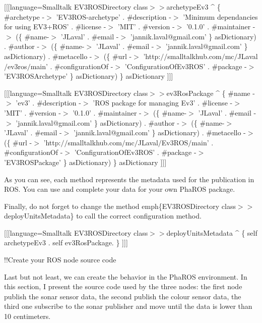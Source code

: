 \documentclass[a4paper,10pt,twoside]{book}
\begin{document}
{[}{[}{[}language=Smalltalk
EV3ROSDirectory class$>$$>$archetypeEv3
  \string^ \{
      \#archetype -$>$ 'EV3ROS-archetype' .
      \#description -$>$ 'Minimum dependancies for using EV3+ROS' .
      \#license -$>$  'MIT'  .
      \#version -$>$ '0.1.0' .
      \#maintainer -$>$ (\{
        \#name-$>$ 'JLaval' .
        \#email -$>$ 'jannik.laval@gmail.com'
      \}  asDictionary) .
      \#author -$>$ (\{
        \#name-$>$ 'JLaval' .
        \#email -$>$ 'jannik.laval@gmail.com'
      \} asDictionary) .
      \#metacello -$>$ (\{
        \#url -$>$ 'http:$/$$/$smalltalkhub.com$/$mc$/$JLaval$/$ev3ros$/$main' .
        \#configurationOf -$>$ 'ConfigurationOfEv3ROS' .
        \#package -$>$ 'EV3ROSArchetype'
      \} asDictionary)
     \} asDictionary
{]}{]}{]}


{[}{[}{[}language=Smalltalk
EV3ROSDirectory class$>$$>$ev3RosPackage
  \string^ \{
      \#name -$>$ 'ev3' .
      \#description -$>$ 'ROS package for managing Ev3' .
      \#license -$>$  'MIT'  .
      \#version -$>$ '0.1.0' .
      \#maintainer -$>$ (\{
        \#name-$>$ 'JLaval' .
        \#email -$>$ 'jannik.laval@gmail.com'
      \}  asDictionary) .
      \#author -$>$ (\{
        \#name-$>$ 'JLaval' .
        \#email -$>$ 'jannik.laval@gmail.com'
      \} asDictionary) .
      \#metacello -$>$ (\{
        \#url -$>$ 'http:$/$$/$smalltalkhub.com$/$mc$/$JLaval$/$Ev3ROS$/$main' .
        \#configurationOf -$>$ 'ConfigurationOfEv3ROS' .
        \#package -$>$ 'EV3ROSPackage'
      \} asDictionary)
     \} asDictionary
{]}{]}{]}

As you can see, each method represents the metadata used for the publication in ROS. You can use and complete your data for your own PhaROS package.

Finally, do not forget to change the method emph\{EV3ROSDirectory class$>$$>$deployUnitsMetadata\} to call the correct configuration method.

{[}{[}{[}language=Smalltalk
EV3ROSDirectory class$>$$>$deployUnitsMetadata
  \string^ \{
    self archetypeEv3 .
    self ev3RosPackage.
   \}
{]}{]}{]}

!!Create your ROS node source code

Last but not least, we can create the behavior in the PhaROS environment.
In this section, I present the source code used by the three nodes: the first node publish the sonar sensor data, the second publish the colour sensor data, the third one subscribe to the sonar publisher and move until the data is lower than 10 centimeters.
\end{document}
